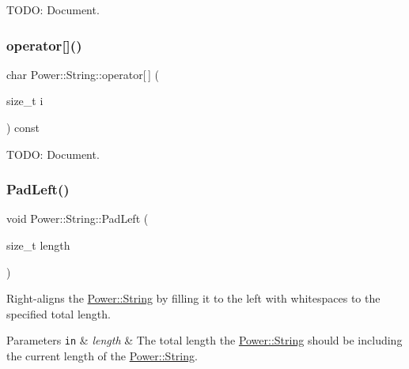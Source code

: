 T\+O\+DO\+: Document. 

\mbox{\label{class_power_1_1_string_a9205107e5478a19d5f54cf0db0677be4}} 
\subsubsection{\texorpdfstring{operator[]()}{operator[]()}}
{\footnotesize\ttfamily char Power\+::\+String\+::operator\mbox{[}$\,$\mbox{]} (\begin{DoxyParamCaption}\item[{size\+\_\+t}]{i }\end{DoxyParamCaption}) const\hspace{0.3cm}{\ttfamily [inline]}}



T\+O\+DO\+: Document. 

\mbox{\label{class_power_1_1_string_a7f70e85bdbec97cc247d08ba74cb00ed}} 
\subsubsection{\texorpdfstring{Pad\+Left()}{PadLeft()}\hspace{0.1cm}{\footnotesize\ttfamily [1/2]}}
{\footnotesize\ttfamily void Power\+::\+String\+::\+Pad\+Left (\begin{DoxyParamCaption}\item[{size\+\_\+t}]{length }\end{DoxyParamCaption})\hspace{0.3cm}{\ttfamily [inline]}}



Right-\/aligns the \hyperlink{class_power_1_1_string}{Power\+::\+String} by filling it to the left with whitespaces to the specified total length. 


\begin{DoxyParams}[1]{Parameters}
\mbox{\tt in}  & {\em length} & The total length the \hyperlink{class_power_1_1_string}{Power\+::\+String} should be including the current length of the \hyperlink{class_power_1_1_string}{Power\+::\+String}. \\
\hline
\end{DoxyParams}
\mbox{\label{class_power_1_1_string_ae1a401f8fc597068ac70fc1f18dee45c}} 
